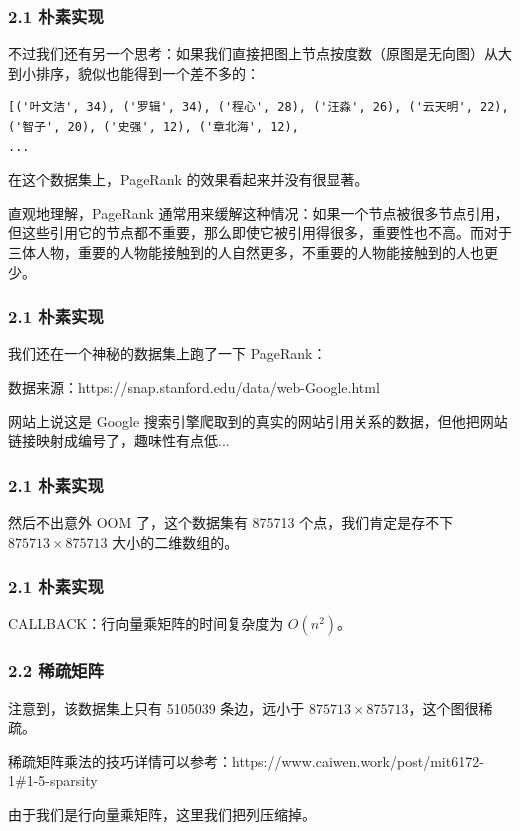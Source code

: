 \documentclass{beamer}
\begin{document}
\begin{frame}[fragile]
	\frametitle{2.1 朴素实现}

	不过我们还有另一个思考：如果我们直接把图上节点按度数（原图是无向图）从大到小排序，貌似也能得到一个差不多的：

	\pause

\begin{lstlisting}
[('叶文洁', 34), ('罗辑', 34), ('程心', 28), ('汪淼', 26), ('云天明', 22), ('智子', 20), ('史强', 12), ('章北海', 12),
...
\end{lstlisting}

	\pause

	在这个数据集上，PageRank 的效果看起来并没有很显著。 
	
	\pause

	直观地理解，PageRank 通常用来缓解这种情况：如果一个节点被很多节点引用，但这些引用它的节点都不重要，那么即使它被引用得很多，重要性也不高。而对于三体人物，重要的人物能接触到的人自然更多，不重要的人物能接触到的人也更少。
\end{frame}

\begin{frame}
	\frametitle{2.1 朴素实现}
	我们还在一个神秘的数据集上跑了一下 PageRank：

	\pause

	数据来源：https://snap.stanford.edu/data/web-Google.html

	\pause

	网站上说这是 Google 搜索引擎爬取到的真实的网站引用关系的数据，但他把网站链接映射成编号了，趣味性有点低...
\end{frame}

\begin{frame}
	\frametitle{2.1 朴素实现}
	然后不出意外 OOM 了，这个数据集有 875713 个点，我们肯定是存不下 \(875713 \times 875713\) 大小的二维数组的。
\end{frame}

\begin{frame}
	\frametitle{2.1 朴素实现}
	CALLBACK：行向量乘矩阵的时间复杂度为 \(O(n^2)\)。
\end{frame}

\begin{frame}
	\frametitle{2.2 稀疏矩阵}
	注意到，该数据集上只有 5105039 条边，远小于 \(875713 \times 875713\)，这个图很稀疏。

	\pause

	稀疏矩阵乘法的技巧详情可以参考：https://www.caiwen.work/post/mit6172-1\#1-5-sparsity

	\pause

	由于我们是行向量乘矩阵，这里我们把列压缩掉。
\end{frame}
\end{document}
